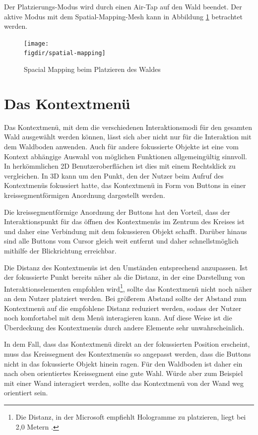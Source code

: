 Der Platzierungs-Modus wird durch einen Air-Tap auf den Wald beendet. Der aktive Modus mit dem Spatial-Mapping-Mesh kann in Abbildung \ref{fig:spatial-mapping} betrachtet werden.

\begin{figure}[htb]
  \texttt{[image: \\figdir/spatial-mapping]}
  \caption{Spacial Mapping beim Platzieren des Waldes}
  \label{fig:spatial-mapping}
\end{figure}

\section{Das Kontextmenü}
Das Kontextmenü, mit dem die verschiedenen Interaktionsmodi für den gesamten Wald ausgewählt werden können, lässt sich aber nicht nur für die Interaktion mit dem Waldboden anwenden. Auch für andere fokussierte Objekte ist eine vom Kontext abhängige Auswahl von möglichen Funktionen allgemeingültig sinnvoll. In herkömmlichen 2D Benutzeroberflächen ist dies mit einem Rechtsklick zu vergleichen. In 3D kann um den Punkt, den der Nutzer beim Aufruf des Kontextmenüs fokussiert hatte, das Kontextmenü in Form von Buttons in einer kreissegmentförmigen Anordnung dargestellt werden.

Die kreissegmentförmige Anordnung der Buttons hat den Vorteil, dass der Interaktionspunkt für das öffnen des Kontextmenüs im Zentrum des Kreises ist und daher eine Verbindung mit dem fokussieren Objekt schafft. Darüber hinaus sind alle Buttons vom Cursor gleich weit entfernt und daher schnellstmöglich mithilfe der Blickrichtung erreichbar.

Die Distanz des Kontextmenüs ist den Umständen entsprechend anzupassen. Ist der fokussierte Punkt bereits näher als die Distanz, in der eine Darstellung von Interaktionselementen empfohlen wird\footnote{Die Distanz, in der Microsoft empfiehlt Hologramme zu platzieren, liegt bei 2,0 Metern \cite{windows2017interaction}.}, sollte das Kontextmenü nicht noch näher an dem Nutzer platziert werden. Bei größerem Abstand sollte der Abstand zum Kontextmenü auf die empfohlene Distanz reduziert werden, sodass der Nutzer noch komfortabel mit dem Menü interagieren kann. Auf diese Weise ist die Überdeckung des Kontextmenüs durch andere Elemente sehr unwahrscheinlich.

In dem Fall, dass das Kontextmenü direkt an der fokussierten Position erscheint, muss das Kreissegment des Kontextmenüs so angepasst werden, dass die Buttons nicht in das fokussierte Objekt hinein ragen. Für den Waldboden ist daher ein nach oben orientiertes Kreissegment eine gute Wahl. Würde aber zum Beispiel mit einer Wand interagiert werden, sollte das Kontextmenü von der Wand weg orientiert sein.

